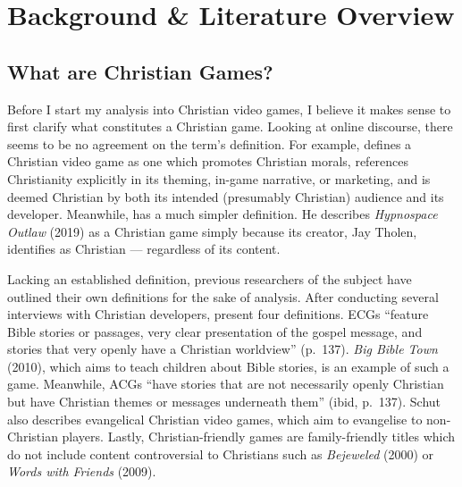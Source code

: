 \chapter{Background \& Literature Overview}


\section{What are Christian Games?}

Before I start my analysis into Christian video games, I believe it makes sense to first clarify what constitutes a Christian game. Looking at online discourse, there seems to be no agreement on the term's definition. For example, \textcite{moon_channel_why_2023} 
defines a Christian video game as one which promotes Christian morals, references Christianity explicitly in its theming, in-game narrative, or marketing, and is deemed Christian by both its intended (presumably Christian) audience and its developer. Meanwhile, \textcite{hartgrove_why_2022} has a much simpler definition. He describes \textit{Hypnospace Outlaw} (2019) as a Christian game simply because its creator, Jay Tholen, identifies as Christian --- regardless of its content.

Lacking an established definition, previous researchers of the subject have outlined their own definitions for the sake of analysis. After conducting several interviews with Christian developers, \textcite{schut_making_2013} present four definitions. \acp{ECG} ``feature Bible stories or passages, very clear presentation of the gospel message, and stories that very openly have a Christian worldview'' (p.~137). \textit{Big Bible Town} (2010), which aims to teach children about Bible stories, is an example of such a game. Meanwhile, \acp{ACG} ``have stories that are not necessarily openly Christian but have Christian themes or messages underneath them'' (ibid, p.~137). Schut also describes evangelical Christian video games, which aim to evangelise to non-Christian players. Lastly, Christian-friendly games are family-friendly titles which do not include content controversial to Christians such as \textit{Bejeweled} (2000) or \textit{Words with Friends} (2009).

